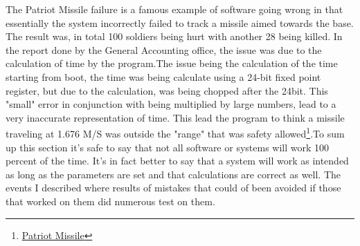 \documentclass[12ptletterpaper]{paper}
\newcommand\tab[1][1cm]{\hspace*{#1}}
\begin{document}
\begin{flushleft}
		\tab The Patriot Missile failure is a famous example of software going wrong in that essentially the system incorrectly failed to track a missile aimed towards the base. The result was, in total 100 soldiers being hurt with another 28 being killed. In the report done by the General Accounting office, the issue was due to the calculation of time by the program.The issue being the calculation of  the time starting from boot, the time was being calculate using a 24-bit fixed point register, but due to the calculation, was being chopped after the 24bit. This "small" error in conjunction with being multiplied by large numbers, lead to a very inaccurate representation of time. This lead the program to think a missile traveling at 1.676 M/S was outside the "range" that was safety allowed\footnote[8]{\hyperlink{Patriot Missile}{Patriot Missile}}.\tab To sum up this section it's safe to say that not all software or systems will work 100 percent of the time. It's in fact better to say that a system will work as intended as long as the parameters are set and that calculations are correct as well. The events I described where results of mistakes that could of been avoided if those that worked on them did numerous test on them.

\end{flushleft}
\end{document}
